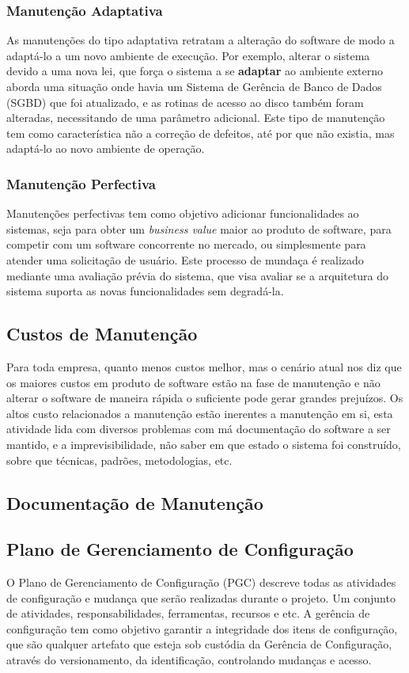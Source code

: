 \subsubsection{Manutenção Adaptativa}
As manutenções do tipo adaptativa retratam a alteração do software de modo a adaptá-lo a um novo ambiente de execução. Por exemplo, alterar o sistema devido a uma nova lei, que força o sistema a se \textbf{adaptar} ao ambiente externo  aborda uma situação onde havia um Sistema de  Gerência de Banco de Dados (SGBD) que foi atualizado, e as rotinas de acesso ao disco também foram alteradas, necessitando de uma parâmetro adicional. Este tipo de manutenção tem como característica não a correção de defeitos, até por que não existia, mas adaptá-lo ao novo ambiente de operação.
\subsubsection{Manutenção Perfectiva}
Manutenções perfectivas tem como objetivo adicionar funcionalidades ao sistemas, seja para obter um \textit{business value} maior ao produto de software, para competir com um software concorrente no mercado, ou simplesmente para atender uma solicitação de usuário. Este processo de mundaça é realizado mediante uma avaliação prévia  do sistema, que visa avaliar se a arquitetura do sistema suporta as novas funcionalidades sem degradá-la.
\subsection{Custos de Manutenção}
Para toda empresa, quanto menos custos melhor, mas o cenário atual nos diz que os maiores custos em produto de software estão na fase de manutenção
e não alterar o software de maneira rápida o suficiente pode gerar grandes prejuízos. Os altos custo relacionados a manutenção estão inerentes a manutenção em si, esta atividade lida com diversos problemas com má documentação do software a ser mantido, e a imprevisibilidade, não saber em que estado o sistema foi construído, sobre que técnicas, padrões, metodologias, etc. 
\subsection{Documentação de Manutenção}

\subsection{Plano de Gerenciamento de Configuração}
O Plano de Gerenciamento de Configuração (PGC) descreve todas as atividades de configuração e mudança que serão realizadas durante o projeto. Um conjunto de atividades, responsabilidades, ferramentas, recursos e etc. A gerência de configuração tem como objetivo garantir a integridade dos itens de configuração, que são qualquer artefato que esteja sob custódia da Gerência de Configuração, através do versionamento, da identificação, controlando mudanças e acesso. 
